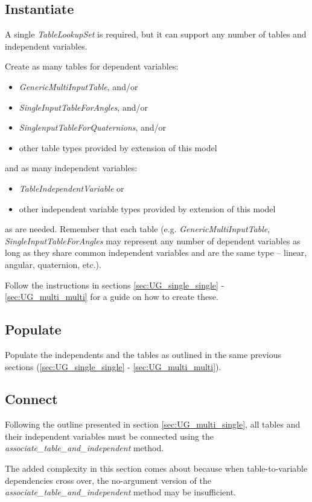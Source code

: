 \documentclass[11pt,fleqn]{report}
\begin{document}
\subsection{Instantiate}
A single \textit{TableLookupSet} is required, but it can support any number
 of tables and independent variables.

Create as many tables for dependent variables:
\begin{itemize}
 \item \textit{GenericMultiInputTable}, and/or
 \item \textit{SingleInputTableForAngles}, and/or
 \item \textit{SinglenputTableForQuaternions}, and/or
 \item other table types provided by extension of this model
\end{itemize}
and as many independent variables:
\begin{itemize}
 \item \textit{TableIndependentVariable} or
 \item other independent variable types provided by extension of this model
\end{itemize}
 as are needed.  Remember that each table (e.g.
 \textit{GenericMultiInputTable},
 \textit{SingleInputTableForAngles} may represent any number of dependent
 variables as long as they share common independent variables and are the same
 type -- linear, angular, quaternion, etc.).

 Follow the instructions in sections
 \ref{sec:UG_single_single} - \ref{sec:UG_multi_multi}
for a guide on how to create these.


\subsection{Populate}
Populate the independents and the tables as outlined in the same previous
 sections (\ref{sec:UG_single_single} - \ref{sec:UG_multi_multi}).

\subsection{Connect}
Following the outline presented in section \ref{sec:UG_multi_single}, all
 tables and their
 independent variables must be connected using the
\textit{associate\_table\_and\_independent} method.

The added complexity in this section comes about because when
table-to-variable dependencies cross over, the no-argument version of the
\textit{associate\_table\_and\_independent} method may be insufficient.
\end{document}
